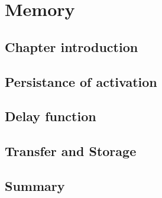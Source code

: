 \chapter{Memory}
\section{Chapter introduction}
\section{Persistance of activation}
\section{Delay function}
\section{Transfer and Storage}
\section{Summary}
